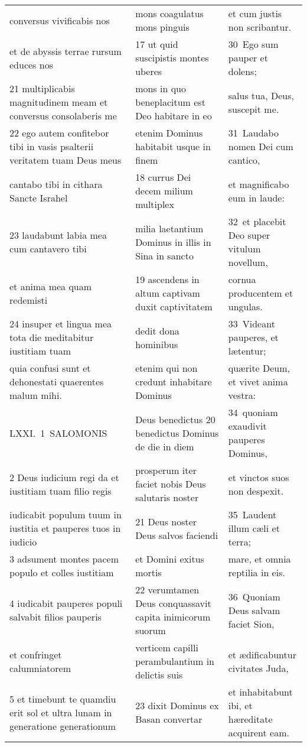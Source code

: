 \documentclass{article}
\begin{document}
\begin{longtable}{@{}p{}p{}p{}@{}}
conversus vivificabis nos	&	mons coagulatus mons pinguis	&	et cum justis non scribantur.	\\
et de abyssis terrae rursum educes nos	&	17 ut quid suscipistis montes uberes	&	30 Ego sum pauper et dolens;	\\
21 multiplicabis magnitudinem meam et conversus consolaberis me	&	mons in quo beneplacitum est Deo habitare in eo	&	salus tua, Deus, suscepit me.	\\
22 ego autem confitebor tibi in vasis psalterii veritatem tuam Deus meus	&	etenim Dominus habitabit usque in finem	&	31 Laudabo nomen Dei cum cantico,	\\
cantabo tibi in cithara Sancte Israhel	&	18 currus Dei decem milium multiplex	&	et magnificabo eum in laude:	\\
23 laudabunt labia mea cum cantavero tibi	&	milia laetantium Dominus in illis in Sina in sancto	&	32 et placebit Deo super vitulum novellum,	\\
et anima mea quam redemisti	&	19 ascendens in altum captivam duxit captivitatem	&	cornua producentem et ungulas.	\\
24 insuper et lingua mea tota die meditabitur iustitiam tuam	&	dedit dona hominibus	&	33 Videant pauperes, et lætentur;	\\
quia confusi sunt et dehonestati quaerentes malum mihi.	&	etenim qui non credunt inhabitare Dominus	&	quærite Deum, et vivet anima vestra:	\\
LXXI. 1 SALOMONIS	&	Deus benedictus 20 benedictus Dominus de die in diem	&	34 quoniam exaudivit pauperes Dominus,	\\
2 Deus iudicium regi da et iustitiam tuam filio regis	&	prosperum iter faciet nobis Deus salutaris noster	&	et vinctos suos non despexit.	\\
iudicabit populum tuum in iustitia et pauperes tuos in iudicio	&	21 Deus noster Deus salvos faciendi	&	35 Laudent illum cæli et terra;	\\
3 adsument montes pacem populo et colles iustitiam	&	et Domini exitus mortis	&	mare, et omnia reptilia in eis.	\\
4 iudicabit pauperes populi salvabit filios pauperis	&	22 verumtamen Deus conquassavit capita inimicorum suorum	&	36 Quoniam Deus salvam faciet Sion,	\\
et confringet calumniatorem	&	verticem capilli perambulantium in delictis suis	&	et ædificabuntur civitates Juda,	\\
5 et timebunt te quamdiu erit sol et ultra lunam in generatione generationum	&	23 dixit Dominus ex Basan convertar	&	et inhabitabunt ibi, et hæreditate acquirent eam.	\\

\end{longtable}
\end{document}
